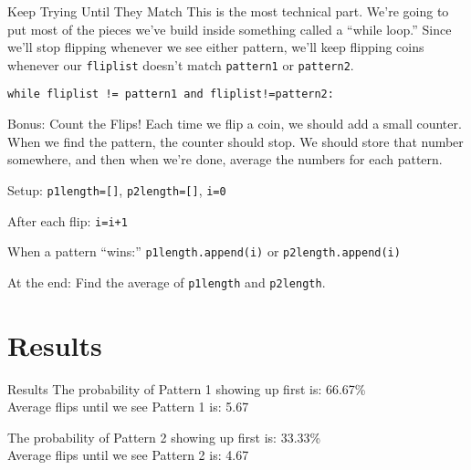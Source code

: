 \documentclass{beamer}
\begin{document}
\begin{frame}{Keep Trying Until They Match}
This is the most technical part. We're going to put most of the pieces we've build inside something called a ``while loop.'' Since we'll stop flipping whenever we see either pattern, we'll keep flipping coins whenever our \texttt{fliplist} doesn't match \texttt{pattern1} or \texttt{pattern2}.\pause

\texttt{while fliplist != pattern1 and fliplist!=pattern2: }
\end{frame}


\begin{frame}{Bonus: Count the Flips!}
Each time we flip a coin, we should add a small counter. When we find the pattern, the counter should stop. We should store that number somewhere, and then when we're done, average the numbers for each pattern.\\ \pause
\vspace{0.2cm}

Setup: \texttt{p1length=[]}, \texttt{p2length=[]}, \texttt{i=0}\\ \pause
\vspace{0.2cm}

After each flip: \texttt{i=i+1}\\ \pause
\vspace{0.2cm}

When a pattern ``wins:'' \texttt{p1length.append(i)} or \texttt{p2length.append(i)}\\ \pause
\vspace{0.2cm}

At the end: Find the average of \texttt{p1length} and \texttt{p2length}.



\end{frame}



\section{Results}

\begin{frame}{Results}
  The probability of Pattern 1 showing up first is: 66.67\%\\
  Average flips until we see Pattern 1 is: 5.67\\
  \vspace{0.5cm}

  The probability of Pattern 2 showing up first is: 33.33\%\\
  Average flips until we see Pattern 2 is: 4.67
\end{frame}

\end{document}
